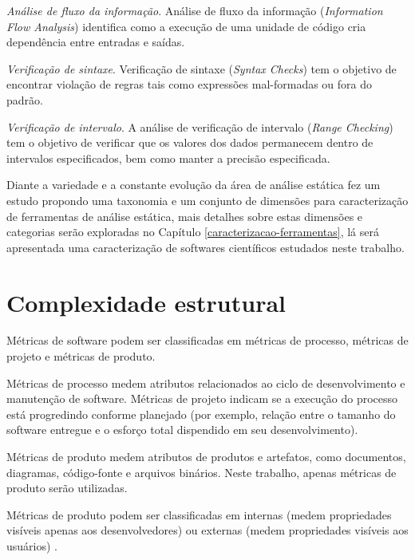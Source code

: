 \begin{description}
  \item \textit{Análise de fluxo da informação}.
    Análise de fluxo da informação ({\it Information Flow Analysis}) identifica
    como a execução de uma unidade de código cria dependência entre entradas e
    saídas.

  \item \textit{Verificação de sintaxe}.
    Verificação de sintaxe ({\it Syntax Checks}) tem o objetivo de encontrar
    violação de regras tais como expressões mal-formadas ou fora do padrão.

  \item \textit{Verificação de intervalo}.
    A análise de verificação de intervalo ({\it Range Checking}) tem o objetivo
    de verificar que os valores dos dados permanecem dentro de intervalos
    especificados, bem como manter a precisão especificada.

\end{description}

Diante a variedade e a constante evolução da área de análise estática
 fez um estudo propondo uma taxonomia e um conjunto de
dimensões para caracterização de ferramentas de análise estática, mais detalhes
sobre estas dimensões e categorias serão exploradas no Capítulo
\ref{caracterizacao-ferramentas}, lá será apresentada uma caracterização de
softwares científicos estudados neste trabalho.

\section{Complexidade estrutural} \label{metricas-de-software}

Métricas de software podem ser classificadas em métricas de processo, métricas
de projeto e métricas de produto.

Métricas de processo medem atributos relacionados ao ciclo de desenvolvimento
e manutenção de software. Métricas de projeto indicam se a execução do
processo está progredindo conforme planejado (por exemplo, relação entre o
tamanho do software entregue e o esforço total dispendido em seu
desenvolvimento).

Métricas de produto medem atributos de produtos e artefatos, como documentos,
diagramas, código-fonte e arquivos binários. Neste trabalho,
apenas métricas de produto serão utilizadas.

Métricas de produto podem ser classificadas em internas (medem propriedades
visíveis apenas aos desenvolvedores) ou externas (medem propriedades visíveis
aos usuários) \cite{Mohamed1994}.

